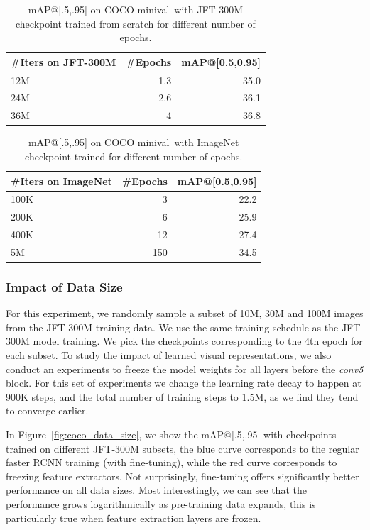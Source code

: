 \documentclass[10pt,twocolumn,letterpaper]{article}
\newcommand{\minival}{minival\raisebox{0.2ex}{$\ast$}}
\begin{document}
\begin{table}
\center
\begin{tabular}{@{}l|r|r@{}}
\#Iters on JFT-300M & \#Epochs &  mAP@[0.5,0.95] \\
\hline
12M & 1.3 &  35.0  \\
24M & 2.6 & 36.1  \\
36M & 4 & 36.8  \\
\end{tabular}
\vspace{0.05in}
\caption{mAP@[.5,.95] on COCO \minival\ with JFT-300M checkpoint trained from scratch for different number of epochs.}
\label{tab:jft_num_epoch}
\end{table}

\begin{table}
\center
\begin{tabular}{@{}l|r|r@{}}
\#Iters on ImageNet & \#Epochs & mAP@[0.5,0.95] \\
\hline
100K & 3 & 22.2 \\
200K & 6 & 25.9 \\
400K & 12 & 27.4 \\
5M & 150 & 34.5 \\
\end{tabular}
\vspace{0.05in}
\caption{mAP@[.5,.95] on COCO \minival\ with ImageNet checkpoint trained for different number of epochs.}
\label{tab:in_num_epoch}
\vspace{-0.01in}
\end{table}


\subsubsection*{Impact of Data Size}\label{sec:impact_data}
For this experiment, we randomly sample a subset of 10M, 30M and 100M images from the JFT-300M training data. We use the same training schedule as the JFT-300M model training. We pick the checkpoints
corresponding to the 4th epoch for each subset. To study the impact of learned visual representations, we also conduct an experiments to freeze the model weights for all layers before the \textit{conv5} block. For this set of experiments we change the learning rate decay to happen at 900K steps, and the total number of training steps to 1.5M, as we find they tend to converge earlier.

In Figure~\ref{fig:coco_data_size}, we show the mAP@[.5,.95] with checkpoints trained on different JFT-300M subsets, the blue curve corresponds to the regular faster RCNN training (with fine-tuning), while the red curve corresponds to freezing feature extractors. Not surprisingly, fine-tuning offers significantly better performance on all data sizes. Most interestingly, we can see that the performance grows logarithmically as pre-training data expands, this is particularly true when feature extraction layers are frozen.
\end{document}
